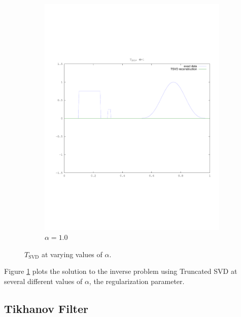 \documentclass{article}
\begin{document}
\begin{figure}[!htb]
\begin{subfigure}[bh]{0.45\textwidth}
                \includegraphics[width=\textwidth]{plots/tsvd1.pdf}
                \caption{$\alpha=1.0$}
        \end{subfigure}
        \caption{$T_{\text{SVD}}$ at varying values of $\alpha$.}
        \label{fig:svd}
\end{figure}

Figure \ref{fig:svd} plots the solution to the inverse problem using
Truncated SVD at several different values of
$\alpha$, the regularization parameter. 

\subsection{Tikhanov Filter}
\end{document}
